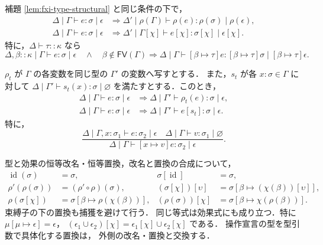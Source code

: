 \begin{lemma}
\label{lem:fxi-typing-type-substitution}
補題 \ref{lem:fxi-type-structural} と同じ条件の下で，
\begin{align*}
  \Delta\mid\Gamma\vdash e:\sigma\mid\epsilon
  &\Longrightarrow
    \Delta'\mid\rho(\Gamma)\vdash
      \rho(e):\rho(\sigma)\mid\rho(\epsilon),\\
  \Delta\mid\Gamma\vdash e:\sigma\mid\epsilon
  &\Longrightarrow
    \Delta'\mid\Gamma[\chi]\vdash
      e[\chi]:\sigma[\chi]\mid\epsilon[\chi].
\end{align*}
特に，$\Delta\vdash\tau::\kappa$ なら
\[
  \Delta,\beta::\kappa\mid\Gamma
    \vdash e:\sigma\mid\epsilon
  \quad\land\quad
  \beta\notin\mathsf{FV}(\Gamma)
  \Longrightarrow
  \Delta\mid\Gamma\vdash
    [\beta\mapsto\tau]e:
    [\beta\mapsto\tau]\sigma\mid
      [\beta\mapsto\tau]\epsilon.
\]
\end{lemma}

\begin{lemma}[項変数の改名と置換]
\label{lem:fxi-term-substitution}
$\rho_t$ が $\Gamma$ の各変数を同じ型の $\Gamma'$ の変数へ写すとする．
また，$s_t$ が各 $x:\sigma\in\Gamma$ に対して
$\Delta\mid\Gamma'\vdash s_t(x):\sigma\mid\varnothing$
を満たすとする．このとき，
\begin{align*}
  \Delta\mid\Gamma\vdash e:\sigma\mid\epsilon
  &\Longrightarrow
    \Delta\mid\Gamma'\vdash\rho_t(e):\sigma\mid\epsilon,\\
  \Delta\mid\Gamma\vdash e:\sigma\mid\epsilon
  &\Longrightarrow
    \Delta\mid\Gamma'\vdash e[s_t]:\sigma\mid\epsilon.
\end{align*}
特に，
\[
  \frac{\Delta\mid\Gamma,x:\sigma_1
            \vdash e:\sigma_2\mid\epsilon
        \quad
        \Delta\mid\Gamma\vdash v:\sigma_1\mid\varnothing}
       {\Delta\mid\Gamma\vdash
          [x\mapsto v]e:\sigma_2\mid\epsilon}.
\]
\end{lemma}

\begin{proposition}[置換に関する補助等式]
\label{prop:fxi-substitution-equations}
型と効果の恒等改名・恒等置換，改名と置換の合成について，
\begin{align*}
  \operatorname{id}(\sigma)&=\sigma,
  &\sigma[\operatorname{id}]&=\sigma,\\
  \rho'(\rho(\sigma))
    &=(\rho'\circ\rho)(\sigma),
  &(\sigma[\chi])[\upsilon]
    &=\sigma[\beta\mapsto(\chi(\beta))[\upsilon]],\\
  \rho(\sigma[\chi])
    &=\sigma[\beta\mapsto\rho(\chi(\beta))],
  &(\rho(\sigma))[\chi]
    &=\sigma[\beta\mapsto\chi(\rho(\beta))].
\end{align*}
束縛子の下の置換も捕獲を避けて行う．
同じ等式は効果式にも成り立つ．特に
$\mu[\mu\mapsto\epsilon]=\epsilon$，
$(\epsilon_1\cup\epsilon_2)[\chi]
 =\epsilon_1[\chi]\cup\epsilon_2[\chi]$ である．
操作宣言の型を型引数で具体化する置換は，
外側の改名・置換と交換する．
\end{proposition}

